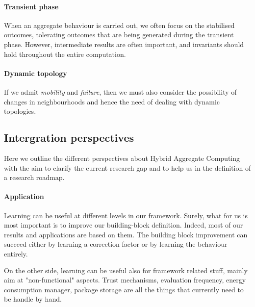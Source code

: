 \documentclass[
  twocolumn,
]{ceurart}
\begin{document}
\paragraph{Transient phase}
%
When an aggregate behaviour is carried out,
 we often focus on the stabilised outcomes,
 tolerating outcomes that are being generated
 during the transient phase.
%
However, intermediate results are often important,
 and invariants should hold throughout the entire computation.

\paragraph{Dynamic topology}
%
If we admit \emph{mobility} and \emph{failure},
 then we must also consider 
 the possibility of changes in neighbourhoods
 and hence the need of dealing with dynamic topologies.


\subsection{Intergration perspectives}
Here we outline the different perspectives about Hybrid Aggregate Computing with the aim
 to clarify the current research gap and to help us in the definition of a research roadmap.
%
\paragraph{Application} Learning can be useful at different levels in our framework.
 Surely, what for us is most important is to improve our building-block definition.
%
 Indeed, most of our results and applications are based on them.
 The building block improvement can succeed either by learning a correction factor 
 or by learning the behaviour entirely.

On the other side, learning can be useful also for framework related stuff,
 mainly aim at "non-functional" aspects. Trust mechanisms, evaluation frequency,
 energy consumption manager, package storage are all the things 
 that currently need to be handle by hand.
 
\end{document}
